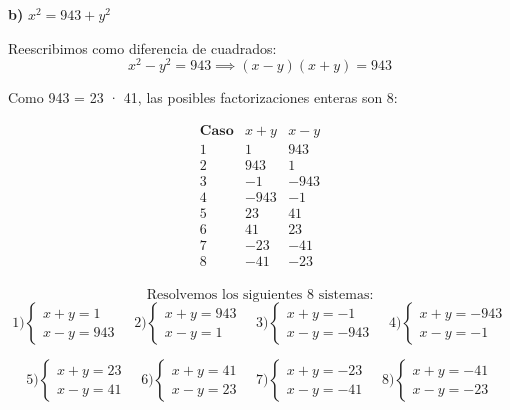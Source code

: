 \documentclass[a4paper,12pt]{article}
\begin{document}
\begin{ejercicio}[title=Ejercicio 18]

\textbf{b) } $x^2 = 943 + y^2$

Reescribimos como diferencia de cuadrados:
\[
x^2 - y^2 = 943 \implies (x - y)(x + y) = 943
\]

Como 943 = 23 · 41, las posibles factorizaciones enteras son 8:

\[
\begin{array}{c|c|c}
\textbf{Caso} & x + y & x - y \\
\hline
1 & 1 & 943 \\
2 & 943 & 1 \\
3 & -1 & -943 \\
4 & -943 & -1 \\
5 & 23 & 41 \\
6 & 41 & 23 \\
7 & -23 & -41 \\
8 & -41 & -23 \\
\end{array}
\]

\[
\text{Resolvemos los siguientes 8 sistemas:}
\]
\vspace{0.1em}
\[
1) \begin{cases}
x + y = 1 \\[2pt]
x - y = 943
\end{cases}
\quad
2) \begin{cases}
x + y = 943 \\[2pt]
x - y = 1
\end{cases}
\quad
3) \begin{cases}
x + y = -1 \\[2pt]
x - y = -943
\end{cases}
\quad
4) \begin{cases}
x + y = -943 \\[2pt]
x - y = -1
\end{cases}
\]

\[
5) \begin{cases}
x + y = 23 \\[2pt]
x - y = 41
\end{cases}
\quad
6) \begin{cases}
x + y = 41 \\[2pt]
x - y = 23
\end{cases}
\quad
7) \begin{cases}
x + y = -23 \\[2pt]
x - y = -41
\end{cases}
\quad
8) \begin{cases}
x + y = -41 \\[2pt]
x - y = -23
\end{cases}
\]


\end{ejercicio}
\end{document}
